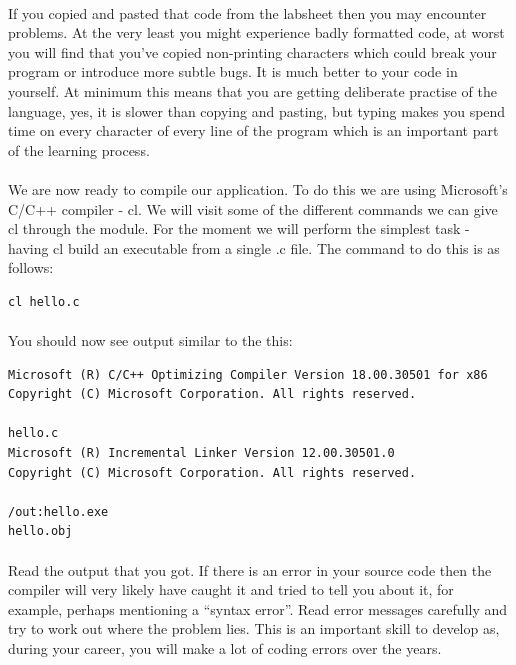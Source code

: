 \documentclass[10pt, a4paper, twosize]{article}
\begin{document}
\paragraph{} If you copied and pasted that code from the labsheet then you may encounter problems. At the very least you might experience badly formatted code, at worst you will find that you've copied non-printing characters which could break your program or introduce more subtle bugs. It is much better to your code in yourself. At minimum this means that you are getting deliberate practise of the language, yes, it is slower than copying and pasting, but typing makes you spend time on every character of every line of the program which is an important part of the learning process.

\paragraph{} We are now ready to compile our application. To do this we are using Microsoft’s C/C++ compiler - cl. We will visit some of the different commands we can give cl through the module. For the moment we will perform the simplest task - having cl build an executable from a single .c file. The command to do this is as follows:

\begin{lstlisting}[style=DOS]
       cl hello.c
\end{lstlisting}

\paragraph{} You should now see output similar to the this:

\begin{lstlisting}[style=DOS]
Microsoft (R) C/C++ Optimizing Compiler Version 18.00.30501 for x86 
Copyright (C) Microsoft Corporation. All rights reserved.

hello.c
Microsoft (R) Incremental Linker Version 12.00.30501.0
Copyright (C) Microsoft Corporation. All rights reserved.

/out:hello.exe 
hello.obj
\end{lstlisting}

\paragraph{} Read the output that you got. If there is an error in your source code then the compiler will very likely have caught it and tried to tell you about it, for example, perhaps mentioning a ``syntax error''. Read error messages carefully and try to work out where the problem lies. This is an important skill to develop as, during your career, you will make a lot of coding errors over the years.
\end{document}
